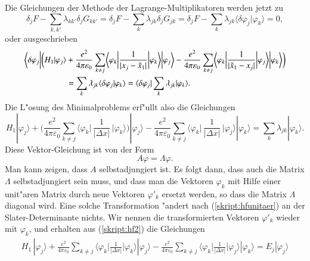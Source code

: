 Die Gleichungen der Methode der Lagrange-Multiplikatoren werden 
jetzt zu
\[
\delta_j F - \sum_{k,k'}\lambda_{kk'}\delta_j G_{kk'}
=
\delta_j F
-
\sum_{k}\lambda_{jk}\delta_j G_{jk}
=\delta_jF
-\sum_k\lambda_{jk}\langle\delta\varphi_j|\varphi_k\rangle
=0,
\]
oder ausgeschrieben
\begin{align}
\bigg\langle\delta\varphi_j\bigg|
\bigg(
H_1|\varphi_j\rangle
&+
\frac{e^2}{4\pi\varepsilon_0}
\sum_{k\ne j}
\biggl\langle\varphi_k\biggr|
\frac{1}{|x_j-\tilde x_1|}
\biggl|\varphi_k\biggr\rangle
\biggl|\varphi_j\biggr\rangle
\notag
-
\frac{e^2}{4\pi\varepsilon_0}
\sum_{k\ne j}
\biggl\langle\varphi_k\biggr|
\frac{1}{|\tilde x_1-x_j|}
\biggl|\varphi_j\biggr\rangle
\biggl|\varphi_k\biggr\rangle
\biggr)
\\
\qquad\qquad
&=
\sum_k\lambda_{jk}\langle\delta\varphi_j|\varphi_k\rangle
=
\langle\delta\varphi_j|
\sum_k\lambda_{jk}
|\varphi_k\rangle.
\label{skript:hf1}
\end{align}
Die L"osung des Minimalproblems erf"ullt also die Gleichungen
\begin{equation}
H_1|\varphi_j\rangle
+
\biggl(
\frac{e^2}{4\pi\varepsilon_0}
\sum_{k\ne j}
\biggl\langle\varphi_k\biggl|\,
\frac{1}{|\Delta x|}
\,\biggr|\varphi_k\biggr\rangle
\biggr)
|\varphi_j\rangle
-
\frac{e^2}{4\pi\varepsilon_0}
\sum_{k\ne j}
\biggl\langle\varphi_k\biggl|\,
\frac{1}{|\Delta x|}
\,\biggr|\varphi_j\biggr\rangle
|\varphi_k\rangle
=
\sum_k\lambda_{jk}
|\varphi_k\rangle.
\label{skript:hf2}
\end{equation}
Diese Vektor-Gleichung ist von der Form
\[
A\varphi = \Lambda \varphi.
\]
Man kann zeigen, dass $A$ selbstadjungiert ist.
Es folgt dann, dass auch die Matrix $\Lambda$ selbstadjungiert sein muss,
und dass man die Vektoren $\varphi_k$ mit Hilfe einer unit"aren Matrix durch
neue Vektoren $\varphi'_k$ ersetzt werden, so dass die
Matrix $\Lambda$ diagonal wird.
Eine solche Transformation "andert nach (\ref{skript:hfunitaer})
an der Slater-Determinante nichts.
Wir nennen die transformierten Vektoren $\varphi'_k$ wieder mit $\varphi_k$,
und erhalten aus (\ref{skript:hf2}) die Gleichungen
\begin{align}
H_1\,|\varphi_j\rangle
+
\frac{e^2}{4\pi\varepsilon_0}
\sum_{k\ne j}
\biggl\langle\varphi_k\biggl|
\frac{1}{|\Delta x|}
\biggr|\varphi_k\biggr\rangle
|\varphi_j\rangle
-
\frac{e^2}{4\pi\varepsilon_0}
\sum_{k\ne j}
\biggl\langle\varphi_k\biggl|
\frac{1}{|\Delta x|}
\biggr|\varphi_j\biggr\rangle
|\varphi_k\rangle
=
E_j
| \varphi_j\rangle
\label{skript:hf3}
\end{align}

